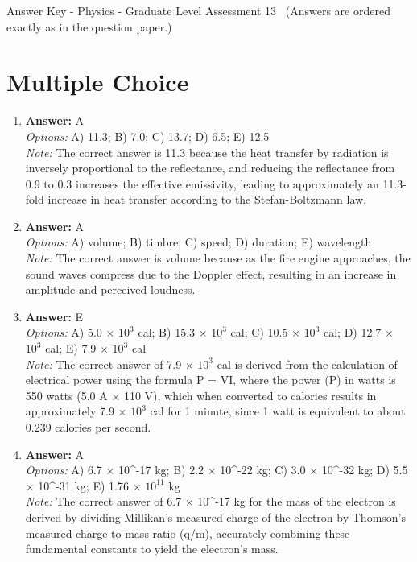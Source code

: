 \documentclass[12pt]{article}
\begin{document}
\begin{center}
Answer Key - Physics - Graduate Level Assessment 13 \
\small (Answers are ordered exactly as in the question paper.)
\end{center}

\section*{Multiple Choice}
\begin{enumerate}[label=\arabic*.]
\item \textbf{Answer:} A
\\ \textit{Options:} A) 11.3; B) 7.0; C) 13.7; D) 6.5; E) 12.5
\\ \textit{Note:} The correct answer is 11.3 because the heat transfer by radiation is inversely proportional to the reflectance, and reducing the reflectance from 0.9 to 0.3 increases the effective emissivity, leading to approximately an 11.3-fold increase in heat transfer according to the Stefan-Boltzmann law.
\item \textbf{Answer:} A
\\ \textit{Options:} A) volume; B) timbre; C) speed; D) duration; E) wavelength
\\ \textit{Note:} The correct answer is volume because as the fire engine approaches, the sound waves compress due to the Doppler effect, resulting in an increase in amplitude and perceived loudness.
\item \textbf{Answer:} E
\\ \textit{Options:} A) 5.0 \ensuremath{\times} $10^3$ cal; B) 15.3 \ensuremath{\times} $10^3$ cal; C) 10.5 \ensuremath{\times} $10^3$ cal; D) 12.7 \ensuremath{\times} $10^3$ cal; E) 7.9 \ensuremath{\times} $10^3$ cal
\\ \textit{Note:} The correct answer of 7.9 × $10^3$ cal is derived from the calculation of electrical power using the formula P = VI, where the power (P) in watts is 550 watts (5.0 A × 110 V), which when converted to calories results in approximately 7.9 × $10^3$ cal for 1 minute, since 1 watt is equivalent to about 0.239 calories per second.
\item \textbf{Answer:} A
\\ \textit{Options:} A) 6.7 \ensuremath{\times} 10^-17 kg; B) 2.2 \ensuremath{\times} 10^-22 kg; C) 3.0 \ensuremath{\times} 10^-32 kg; D) 5.5 \ensuremath{\times} 10^-31 kg; E) 1.76 \ensuremath{\times} $10^11$ kg
\\ \textit{Note:} The correct answer of 6.7 × 10^-17 kg for the mass of the electron is derived by dividing Millikan's measured charge of the electron by Thomson's measured charge-to-mass ratio (q/m), accurately combining these fundamental constants to yield the electron's mass.

\end{enumerate}
\end{document}
